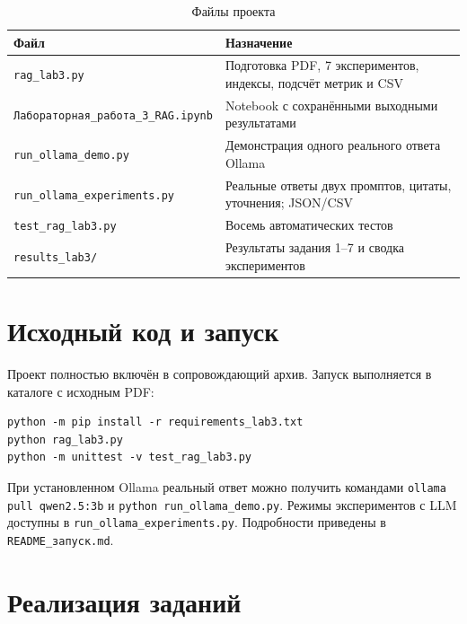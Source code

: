 \documentclass[12pt,a4paper]{article}
\begin{document}
\begin{table}[H]\centering\caption{Файлы проекта}\small
\begin{tabular}{|L{5.0cm}|L{9.0cm}|}\hline
Файл & Назначение \\ \hline
\texttt{rag\_lab3.py} & Подготовка PDF, 7 экспериментов, индексы, подсчёт метрик и CSV \\ \hline
\texttt{Лабораторная\_работа\_3\_RAG.ipynb} & Notebook с сохранёнными выходными результатами \\ \hline
\texttt{run\_ollama\_demo.py} & Демонстрация одного реального ответа Ollama \\ \hline
\texttt{run\_ollama\_experiments.py} & Реальные ответы двух промптов, цитаты, уточнения; JSON/CSV \\ \hline
\texttt{test\_rag\_lab3.py} & Восемь автоматических тестов \\ \hline
\texttt{results\_lab3/} & Результаты задания 1--7 и сводка экспериментов \\ \hline
\end{tabular}
\end{table}

\section{Исходный код и запуск}
Проект полностью включён в сопровождающий архив. Запуск выполняется в каталоге с исходным PDF:
\begin{lstlisting}[language={},caption={Установка и проверка проекта}]
python -m pip install -r requirements_lab3.txt
python rag_lab3.py
python -m unittest -v test_rag_lab3.py
\end{lstlisting}
При установленном Ollama реальный ответ можно получить командами \texttt{ollama pull qwen2.5:3b} и \texttt{python run\_ollama\_demo.py}. Режимы экспериментов с LLM доступны в \texttt{run\_ollama\_experiments.py}. Подробности приведены в \texttt{README\_запуск.md}.

\section{Реализация заданий}
\end{document}
